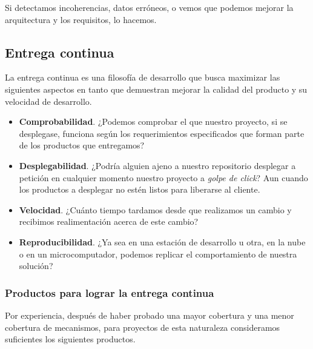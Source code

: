Si detectamos incoherencias, datos erróneos, o vemos que podemos mejorar
la arquitectura y los requisitos, lo hacemos.

\subsection{Entrega continua}

La entrega continua es una filosofía de desarrollo que busca maximizar las
siguientes aspectos en tanto que demuestran mejorar la calidad del producto
y su velocidad de desarrollo. \cite{ModernSoftwareEngineering} \cite{minimumViableCD} \cite{ContinuousDelivery} \cite{accelerate}

\begin{itemize}[noitemsep,nolistsep]
    \item \textbf{Comprobabilidad}. ¿Podemos comprobar el que nuestro proyecto, si se desplegase,
          funciona según
          los requerimientos especificados que forman parte de los productos que
          entregamos?
    \item \textbf{Desplegabilidad}. ¿Podría alguien ajeno a nuestro repositorio desplegar a
          petición en cualquier momento nuestro proyecto a \textit{golpe de click}?
          Aun cuando los productos a desplegar no estén listos para liberarse al cliente.
    \item \textbf{Velocidad}. ¿Cuánto tiempo tardamos desde que realizamos un cambio y recibimos
          realimentación acerca de este cambio?
    \item \textbf{Reproducibilidad}. ¿Ya sea en una estación de desarrollo u otra, en la nube
          o en un microcomputador, podemos replicar el comportamiento de nuestra solución?
\end{itemize}

\subsubsection{Productos para lograr la entrega continua}

Por experiencia, después de haber probado una mayor cobertura y una
menor cobertura de mecanismos, para proyectos de esta naturaleza
consideramos suficientes los siguientes productos.

